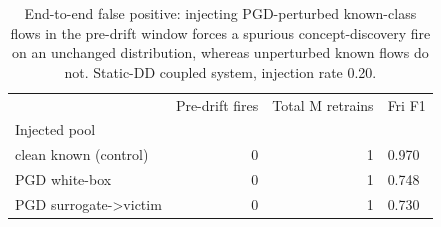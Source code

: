 \begin{table}
\caption{End-to-end false positive: injecting PGD-perturbed known-class flows in the pre-drift window forces a spurious concept-discovery fire on an unchanged distribution, whereas unperturbed known flows do not. Static-DD coupled system, injection rate 0.20.}
\label{tab:rq3-pgd-end-to-end}
\begin{tabular}{lrrl}
\toprule
 & Pre-drift fires & Total M retrains & Fri F1 \\
Injected pool &  &  &  \\
\midrule
clean known (control) & 0 & 1 & 0.970 \\
PGD white-box & 0 & 1 & 0.748 \\
PGD surrogate->victim & 0 & 1 & 0.730 \\
\bottomrule
\end{tabular}
\end{table}
